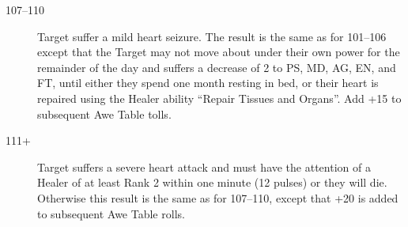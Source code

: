 \begin{multicols}{2}
\begin{description}
\item[107--110] Target suffer a mild heart seizure.  The result is the
same as for 101--106 except that the Target may not move about under
their own power for the remainder of the day and suffers a decrease of
2 to PS, MD, AG, EN, and FT, until either they spend one month resting
in bed, or their heart is repaired using the Healer ability ``Repair
Tissues and Organs''.  Add +15 to subsequent Awe Table tolls.

\item[111+] Target suffers a severe heart attack and must have the
attention of a Healer of at least Rank 2 within one minute (12 pulses)
or they will die.  Otherwise this result is the same as for 107--110,
except that +20 is added to subsequent Awe Table rolls.
\end{description}
\end{multicols}

